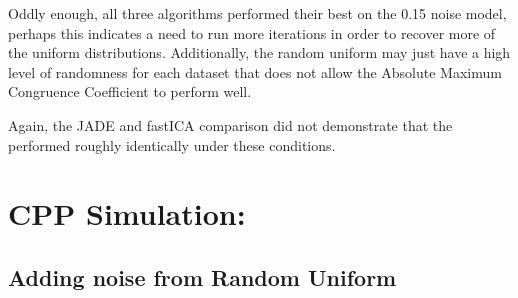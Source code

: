 \documentclass[12pt,twoside]{amherstthesis}
\begin{document}
  Oddly enough, all three algorithms performed their best on the 0.15
  noise model, perhaps this indicates a need to run more iterations in
  order to recover more of the uniform distributions. Additionally, the
  random uniform may just have a high level of randomness for each dataset
  that does not allow the Absolute Maximum Congruence Coefficient to
  perform well.
  
  Again, the JADE and fastICA comparison did not demonstrate that the
  performed roughly identically under these conditions.
  
  \section{CPP Simulation:}\label{cpp-simulation}
  
  \subsection{Adding noise from Random
  Uniform}\label{adding-noise-from-random-uniform}
  
  \begin{Shaded}
  \begin{Highlighting}[]
  \StringTok{ }
  \NormalTok{(}\NormalTok{)}
  \StringTok{ }\NormalTok{CPPdata[}\NormalTok{(}\NormalTok{),]}
  \NormalTok{(}\NormalTok{(}\NormalTok{),}\NormalTok{,}\NormalTok{)}
  \StringTok{ }
  \StringTok{ }\NormalTok{(}\NormalTok{,}\NormalTok{)}
  
  \StringTok{ }
  \StringTok{ }\NormalTok{(}
  \StringTok{ }\OperatorTok{:}
  \StringTok{ }\NormalTok{,}\NormalTok{)}
     \OperatorTok{:}
        \OperatorTok{<}
  \StringTok{ }\NormalTok{,}\NormalTok{)[i]}
  
  \NormalTok{      \}}\NormalTok{ \{}
  \StringTok{ }\NormalTok{CPPdata[}\NormalTok{(t)[}\NormalTok{]]}
  \NormalTok{      \}}
  \NormalTok{  \}}
  \StringTok{ }\NormalTok{,}
  \NormalTok{\}}
  \end{Highlighting}
  \end{Shaded}
  
\end{document}
